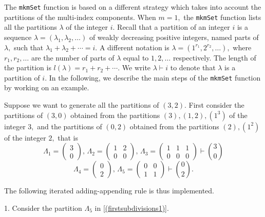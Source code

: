 The \texttt{mkmSet} function is based on a different strategy which
takes into account the partitions of the multi-index components. When
\(m=1,\) the \texttt{mkmSet} function lists all the partitions
\(\lambda\) of the integer \(i.\) Recall that a partition of an integer
\(i\) is a sequence \(\lambda = (\lambda_1, \lambda_2, \ldots)\) of
weakly decreasing positive integers, named parts of \(\lambda,\) such
that \(\lambda_1 + \lambda_2 + \cdots = i.\) A different notation is
\(\lambda = (1^{r_1}, 2^{r_2}, \ldots),\) where \(r_1, r_2, \ldots\) are
the number of parts of \(\lambda\) equal to \(1,2,\ldots\) respectively.
The length of the partition is \(l(\lambda)=r_1 + r_2 + \cdots.\) We
write \(\lambda \vdash i\) to denote that \(\lambda\) is a partition of
\(i.\) In the following, we describe the main steps of the
\texttt{mkmSet} function by working on an example.

Suppose we want to generate all the partitions of \((3,2).\) First
consider the partitions of \((3,0)\) obtained from the partitions
\((3), (1,2), (1^3)\) of the integer \(3,\) and the partitions of
\((0,2)\) obtained from the partitions \((2),(1^2)\) of the integer
\(2,\) that is \begin{equation}
\Lambda_1= \begin{pmatrix}
3 \\
0
\end{pmatrix}\!\!, \, \Lambda_2= \begin{pmatrix}
1 & 2 \\
0 & 0
\end{pmatrix}\!\!, \, \Lambda_3=\begin{pmatrix}
1 & 1 & 1 \\
0 & 0 & 0
\end{pmatrix} \vdash {3 \choose 0}
\label{(firstsubdivisions)}
\end{equation} \begin{equation}
\Lambda_4= \begin{pmatrix}
0 \\
2
\end{pmatrix}\!\!, \, \Lambda_5= \begin{pmatrix}
0 & 0 \\
1 & 1
\end{pmatrix} \vdash {0 \choose 2}.
\label{(firstsubdivisions1)}
\end{equation}

\noindent The following iterated adding-appending rule is thus
implemented.

\hskip-0.5cm 1. Consider the partition \(\Lambda_5\) in
\eqref{(firstsubdivisions1)}.

